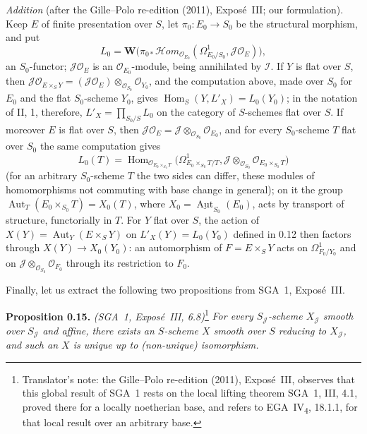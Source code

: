 \emph{Addition} (after the Gille--Polo re-edition (2011), Exposé~III; our
formulation). Keep \(E\) of finite presentation over \(S\), let
\(\pi_0\colon E_0\to S_0\) be the structural morphism, and put
\[
 L_0=\mathbf W\bigl(\pi_{0*}\mathscr{H}om_{\mathscr O_{E_0}}
 (\Omega^1_{E_0/S_0},\mathscr J\mathscr O_E)\bigr),
\]
an \(S_0\)-functor; \(\mathscr J\mathscr O_E\) is an
\(\mathscr O_{E_0}\)-module, being annihilated by \(\mathscr I\). If \(Y\) is
flat over \(S\), then
\(\mathscr J\mathscr O_{E\times_SY}=(\mathscr J\mathscr O_E)
\otimes_{\mathscr O_{S_0}}\mathscr O_{Y_0}\), and the computation above, made
over \(S_0\) for \(E_0\) and the flat \(S_0\)-scheme \(Y_0\), gives
\(\operatorname{Hom}_S(Y,L'_X)=L_0(Y_0)\); in the notation of II, 1,
therefore, \(L'_X=\prod_{S_0/S}L_0\) on the category of \(S\)-schemes flat
over \(S\). If moreover \(E\) is flat over \(S\), then
\(\mathscr J\mathscr O_E=\mathscr J\otimes_{\mathscr O_{S_0}}\mathscr O_{E_0}\),
and for every \(S_0\)-scheme \(T\) flat over \(S_0\) the same computation
gives
\[
 L_0(T)=\operatorname{Hom}_{\mathscr O_{E_0\times_{S_0}T}}
 \bigl(\Omega^1_{E_0\times_{S_0}T/T},
 \mathscr J\otimes_{\mathscr O_{S_0}}\mathscr O_{E_0\times_{S_0}T}\bigr)
\]
(for an arbitrary \(S_0\)-scheme \(T\) the two sides can differ, these modules
of homomorphisms not commuting with base change in general); on it the
group \(\operatorname{Aut}_T(E_0\times_{S_0}T)=X_0(T)\), where
\(X_0=\underline{\operatorname{Aut}}_{S_0}(E_0)\), acts by transport of
structure, functorially in \(T\). For \(Y\) flat over \(S\), the action of
\(X(Y)=\operatorname{Aut}_Y(E\times_SY)\) on \(L'_X(Y)=L_0(Y_0)\) defined in
0.12 then factors through \(X(Y)\to X_0(Y_0)\): an automorphism of
\(F=E\times_SY\) acts on \(\Omega^1_{F_0/Y_0}\) and on
\(\mathscr J\otimes_{\mathscr O_{S_0}}\mathscr O_{F_0}\) through its
restriction to \(F_0\).

Finally, let us extract the following two propositions from SGA~1,
Expos\'e~III.

\medskip
\noindent{}\textbf{Proposition 0.15.}
\textit{(SGA~1, Expos\'e~III, 6.8)}\footnote{Translator's note: the Gille--Polo re-edition (2011), Exposé~III, observes that
this global result of SGA~1 rests on the local lifting theorem SGA~1, III, 4.1,
proved there for a locally noetherian base, and refers to
EGA~IV\textsubscript{4}, 18.1.1, for that local result over an arbitrary
base.}
\textit{For every \(S_{\mathscr J}\)-scheme \(X_{\mathscr J}\) smooth over
\(S_{\mathscr J}\) and affine, there exists an \(S\)-scheme \(X\) smooth over
\(S\) reducing to \(X_{\mathscr J}\), and such an \(X\) is unique up to
(non-unique) isomorphism.}

